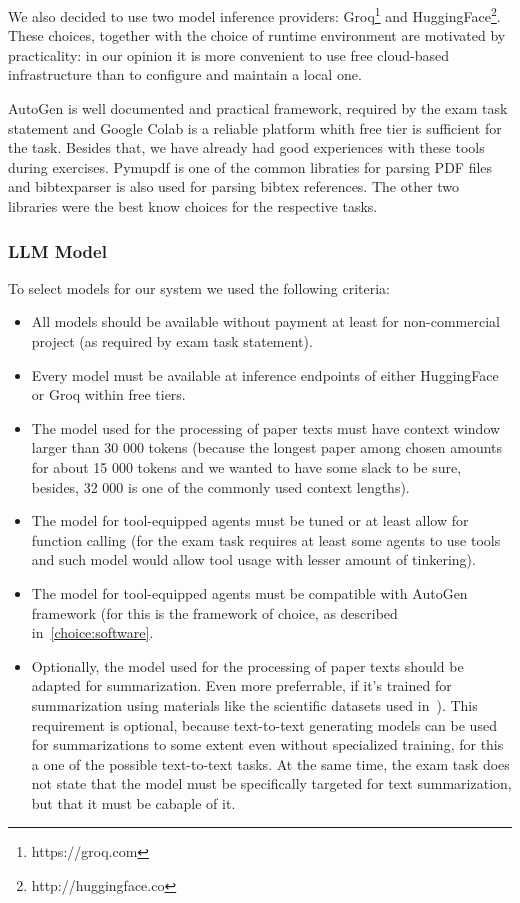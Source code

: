 We also decided to use two model inference providers: Groq\footnote{https://groq.com} and HuggingFace\footnote{http://huggingface.co}. These choices, together with the choice of runtime environment are motivated by practicality: in our opinion it is more convenient to use free cloud-based infrastructure than to configure and maintain a local one.

AutoGen is well documented and practical framework, required by the exam task statement and Google Colab is a reliable platform whith free tier is sufficient for the task. Besides that, we have already had good experiences with these tools during exercises. Pymupdf is one of the common libraties for parsing PDF files and bibtexparser is also used for parsing bibtex references. The other two libraries were the best know choices for the respective tasks.



\subsubsection{LLM Model}
\label{choice:model}

To select models for our system we used the following criteria:

\begin{itemize}
	\item All models should be available without payment at least for non-commercial project  (as required by exam task statement).
	\item Every model must be available at inference endpoints of either HuggingFace or Groq within free tiers.
	\item The model used for the processing of paper texts must have context window larger than 30 000 tokens (because the longest paper among chosen amounts for about 15 000 tokens and we wanted to have some slack to be sure, besides, 32 000 is one of the commonly used context lengths).
	\item The model for tool-equipped agents must be tuned or at least allow for function calling (for the exam task requires at least some agents to use tools and such model would allow tool usage with lesser amount of tinkering).
	\item The model for tool-equipped agents must be compatible with AutoGen framework (for this is the framework of choice, as described in~\ref{choice:software}.
	\item Optionally, the model used for the processing of paper texts should be adapted for summarization. Even more preferrable, if it's trained for summarization using materials like the scientific datasets used in~\cite{Cohan_2018}). This requirement is optional, because text-to-text generating models can be used for summarizations to some extent even without specialized training, for this a one of the possible text-to-text tasks. At the same time, the exam task does not state that the model must be specifically targeted for text summarization, but that it must be cabaple of it.
\end{itemize}

